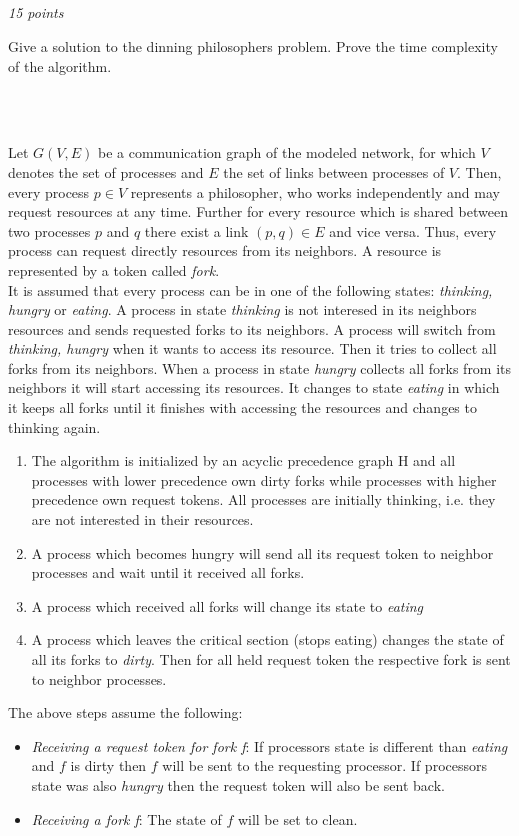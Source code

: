 \documentclass[a4paper]{article}
\newcommand{\points}[1]{\subsection{} \textit{#1 points}\\}
\newcommand{\question}[2][]{
  \noindent
  \parbox[t]{\textwidth}{#1 \parbox[t]{0.95\textwidth}{#2}}\\
}
\begin{document}
\points{15}
\question{
  Give a solution to the dinning philosophers problem. Prove the time
  complexity of the algorithm.
}\\
%
\begin{lrbox}{\userinput}
  \begin{minipage}{\linewidth}
    Let $G(V,E)$ be a communication graph of the modeled network, for which $V$ denotes the set
    of processes and $E$ the set of links between processes of $V$. Then, every process $p \in V$
    represents a philosopher, who works independently and may request resources at any time. Further
    for every resource which is shared between two processes $p$ and $q$ there exist a link $(p,q) \in E$
    and vice versa. Thus, every process can request directly resources from its neighbors. A resource
    is represented by a token called \textit{fork}.\\
    It is assumed that every process can be in one of the following states: \textit{thinking, hungry} 
    or \textit{eating}. A process in state \textit{thinking} is not interesed in its neighbors resources
    and sends requested forks to its neighbors. A process will switch from \textit{thinking, hungry} when
    it wants to access its resource. Then it tries to collect all forks from its neighbors. When a process
    in state \textit{hungry} collects all forks from its neighbors it will start accessing its resources. 
    It changes to state \textit{eating} in which it keeps all forks until it finishes with accessing the
    resources and changes to thinking again. 
    \begin{enumerate}
	\item The algorithm is initialized by an acyclic precedence graph H and all processes
	with lower precedence own dirty forks while processes with higher precedence own
	request tokens. All processes are initially thinking, i.e. they are not interested
	in their resources. 
	\item A process which becomes hungry will send all its request token to neighbor 
	processes and wait until it received all forks. 
	\item A process which received all forks will change its state to \textit{eating}
	\item A process which leaves the critical section (stops eating) changes the state 
	of all its forks to \textit{dirty}. Then for all held request token the respective
	fork is sent to neighbor processes.	
    \end{enumerate}
    The above steps assume the following: 
    \begin{itemize}
	\item \textit{Receiving a request token for fork f}: If processors state is different
	than \textit{eating} and $f$ is dirty then $f$ will be sent to the requesting processor.
	If processors state was also \textit{hungry} then the request token will also be sent back.
	\item \textit{Receiving a fork f}: The state of $f$ will be set to clean. 
    \end{itemize}
  \end{minipage}
\end{lrbox}
\end{document}
